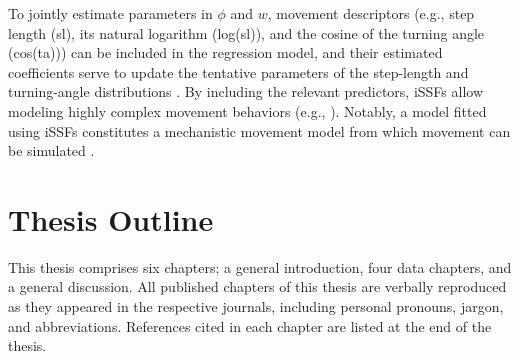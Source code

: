\documentclass[../FinalThesis.tex]{subfiles}
\begin{document}
To jointly estimate parameters in $\phi$ and $w$, movement descriptors (e.g.,
step length (sl), its natural logarithm (log(sl)), and the cosine of the turning
angle (cos(ta))) can be included in the regression model, and their estimated
coefficients serve to update the tentative parameters of the step-length and
turning-angle distributions \citep{Duchesne.2015, Avgar.2016, Fieberg.2021}. By
including the relevant predictors, iSSFs allow modeling highly complex movement
behaviors (e.g., \citealp{Munden.2021, Forrest.2024}). Notably, a model fitted
using iSSFs constitutes a mechanistic movement model from which movement can be
simulated \citep{Avgar.2016, Signer.2017, Signer.2024}.

\section{Thesis Outline}

This thesis comprises six chapters; a general introduction, four data chapters,
and a general discussion. All published chapters of this thesis are verbally
reproduced as they appeared in the respective journals, including personal
pronouns, jargon, and abbreviations. References cited in each chapter are
listed at the end of the thesis.


\end{document}
